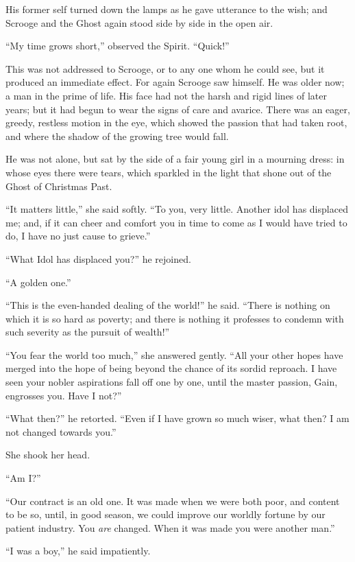 \documentclass[paper=a5,BCOR=15mm,twoside,DIV=15,headinclude=off,12pt,chapterprefix=off,openany,headings=huge]{scrbook} %
\begin{document}
His former self turned down the lamps as he gave utterance to the wish; and Scrooge and the Ghost again stood side by side in the open air.

\enquote{My time grows short,} observed the Spirit. \enquote{Quick!}

This was not addressed to Scrooge, or to any one whom he could see, but it produced an immediate effect. For again Scrooge saw himself. He was older now; a man in the prime of life. His face had not the harsh and rigid lines of later years; but it had begun to wear the signs of care and avarice. There was an eager, greedy, restless motion in the eye, which showed the passion that had taken root, and where the shadow of the growing tree would fall.

He was not alone, but sat by the side of a fair young girl in a mourning dress: in whose eyes there were tears, which sparkled in the light that shone out of the Ghost of Christmas Past.

\enquote{It matters little,} she said softly. \enquote{To you, very little. Another idol has displaced me; and, if it can cheer and comfort you in time to come as I would have tried to do, I have no just cause to grieve.}

\enquote{What Idol has displaced you?} he rejoined.

\enquote{A golden one.}

\enquote{This is the even-handed dealing of the world!} he said. \enquote{There is nothing on which it is so hard as poverty; and there is nothing it professes to condemn with such severity as the pursuit of wealth!}

\enquote{You fear the world too much,} she answered gently. \enquote{All your other hopes have merged into the hope of being beyond the chance of its sordid reproach. I have seen your nobler aspirations fall off one by one, until the master passion, Gain, engrosses you. Have I not?}

\enquote{What then?} he retorted. \enquote{Even if I have grown so much wiser, what then? I am not changed towards you.}

She shook her head.

\enquote{Am I?}

\enquote{Our contract is an old one. It was made when we were both poor, and content to be so, until, in good season, we could improve our worldly fortune by our patient industry. You \textit{are} changed. When it was made you were another man.}

\enquote{I was a boy,} he said impatiently.
\end{document}
